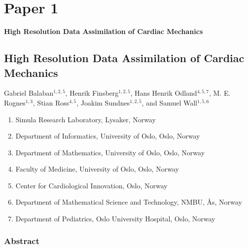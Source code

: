 
\graphicspath{{chapters/paper1/figures/}}


\chapter{Paper 1}
{\Huge \textbf{High Resolution Data Assimilation of Cardiac
  Mechanics}}

\newpage
\renewcommand{\thefootnote}{\fnsymbol{footnote}}

\section*{High Resolution Data Assimilation of Cardiac Mechanics}


Gabriel Balaban$^{1,2,5}$\footnotemark[\value{footnote}],
Henrik Finsberg$^{1,2,5}$\footnotemark,
Hans Henrik Odland$^{4,5,7}$,
M. E. Rognes$^{1,3}$,
Stian Ross$^{4,5}$,
Joakim Sundnes$^{1,2,5}$, and
Samuel Wall$^{1,5,6}$


\footnotesize
\begin{enumerate}[itemsep=-2mm]
\item{Simula Research Laboratory, Lysaker, Norway}
\item{Department of Informatics, University of Oslo, Oslo, Norway}
\item{Department of Mathematics, University of Oslo, Oslo, Norway}
\item{Faculty of Medicine, University of Oslo, Oslo, Norway}
\item{Center for Cardiological Innovation, Oslo, Norway}
\item{Department of Mathematical Science and Technology, NMBU, \r{A}s,
    Norway}
\item{Department of Pediatrics, Oslo University Hospital, Oslo, Norway}
\end{enumerate}
\normalsize

\subsection*{Abstract}



